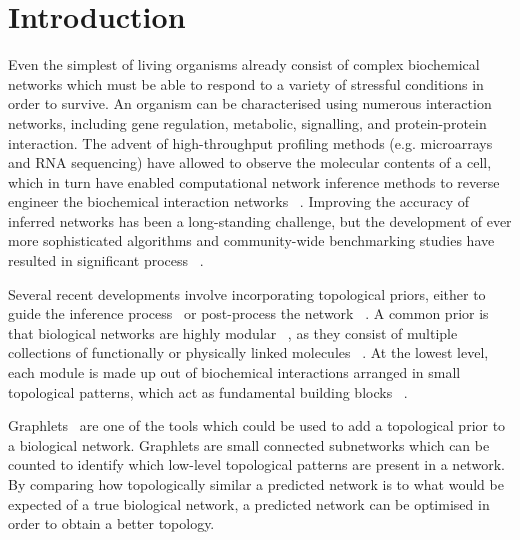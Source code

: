 \section*{Introduction}
Even the simplest of living organisms already consist of complex biochemical networks which must be able to respond to a variety of stressful conditions in order to survive. 
An organism can be characterised using numerous interaction networks, including gene regulation, metabolic, signalling, and protein-protein interaction. 
The advent of high-throughput profiling methods (e.g. microarrays and RNA sequencing) have allowed to observe the molecular contents of a cell, which in turn have enabled computational network inference methods to reverse engineer the biochemical interaction networks~ \cite{albert_networkinferenceanalysis_2007}.
Improving the accuracy of inferred networks has been a long-standing challenge, but the development of ever more sophisticated algorithms and community-wide benchmarking studies have resulted in significant process~ \cite{marbach_revealingstrengthsweaknesses_2010, narendra_comprehensiveassessmentmethods_2011, marbach_wisdomcrowdsrobust_2012, aijo_biophysicallymotivatedregulatory_2017}. 

Several recent developments involve incorporating topological priors, either to guide the inference process~ \cite{lopes_featureselectiontechnique_2014} or post-process the network~ \cite{ruyssinck_netterrerankinggene_2016}.
A common prior is that biological networks are highly modular~ \cite{rives_modularorganizationcellular_2003}, as they consist of multiple collections of functionally or physically linked molecules~ \cite{hartwell_molecularmodularcell_1999,barabasi_networkbiologyunderstanding_2004}. At the lowest level, each module is made up out of biochemical interactions arranged in small topological patterns, which act as fundamental building blocks~ \cite{milo_networkmotifssimple_2002}.

Graphlets~ \cite{przulj_modelinginteractomescalefree_2004} are one of the tools which could be used to add a topological prior to a biological network.
Graphlets are small connected subnetworks which can be counted to identify which low-level topological patterns are present in a network. By comparing how topologically similar a predicted network is to what would be expected of a true biological network, a predicted network can be optimised in order to obtain a better topology. 

